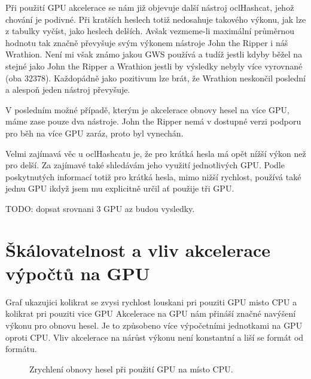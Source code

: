 Při použití GPU akcelerace se nám již objevuje další nástroj oclHashcat, jehož chování je
podivné. Při kratších heslech totiž nedosahuje takového výkonu, jak lze z tabulky vyčíst, jako
heslech delších. Avšak vezmeme-li maximální průměrnou hodnotu tak značně převyšuje svým výkonem
nástroje John the Ripper i náš Wrathion. Není mi však známo jakou GWS používá a tudíž jestli
kdyby běžel na stejné jako John the Ripper a Wrathion jestli by výsledky nebyly více vyrovnané
(oba 32378). Každopádně jako pozitivum lze brát, že Wrathion neskončil poslední a alespoň jeden
nástroj převyšuje.

V posledním možné případě, kterým je akcelerace obnovy hesel na více GPU, máme zase pouze dva
nástroje. John the Ripper nemá v dostupné verzi podporu pro běh na více GPU zaráz, proto byl
vynechán. 

Velmi zajímavá věc u oclHashcatu je, že pro krátká hesla má opět nížší výkon než pro delší. Za
zajímavé také shledávám jeho využití jednotlivých GPU. Podle poskytnutých informací totiž pro
krátká hesla, mimo nižší rychlost, používá také jednu GPU ikdyž jsem mu explicitně určil ať
použije tři GPU.

TODO: dopsat srovnani 3 GPU az budou vysledky.
\section{Škálovatelnost a vliv akcelerace výpočtů na GPU}
\label{sec:skalovatelnost}
Graf ukazujici kolikrat se zvysi rychlost louskani pri pouziti GPU misto CPU a kolikrat pri pouziti
vice GPU
Akcelerace na GPU nám přináší značné navýšení výkonu pro obnovu hesel. Je to způsobeno více
výpočetními jednotkami na GPU oproti CPU. Vliv akcelerace na nárůst výkonu není konstantní a liší
se formát od formátu.
\begin{center}
    \begin{figure}[ht]
	\caption{Zrychlení obnovy hesel při použití GPU na místo CPU.}
	\label{memory}
    \end{figure}
\end{center}

